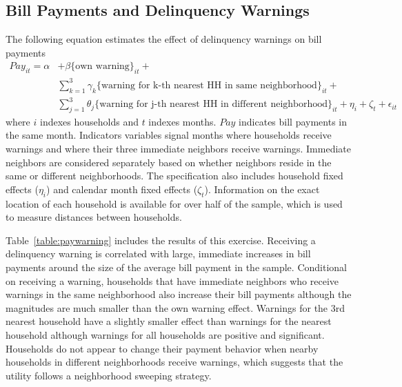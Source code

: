 \documentclass[12pt,table]{article}
\begin{document}
\subsection{Bill Payments and Delinquency Warnings}\label{appendix:paywarning}

The following equation estimates the effect of delinquency warnings on bill payments
\begin{align*}
Pay_{it} = \alpha &+ \beta  \{ \text{own warning} \}_{it} + \\
 &\sum_{k=1}^{3} \gamma_k \{ \text{warning for k-th nearest HH in same neighborhood} \}_{it} +  \\
 &\sum_{j=1}^{3} \theta_j \{ \text{warning for j-th nearest HH in different neighborhood} \}_{it} + \eta_i + \zeta_t + \epsilon_{it}
\end{align*}
where $i$ indexes households and $t$ indexes months.  $Pay$ indicates bill payments in the same month.  Indicators variables signal months where households receive warnings and where their three immediate neighbors receive warnings.  Immediate neighbors are considered separately based on whether neighbors reside in the same or different neighborhoods.  The specification also includes household fixed effects ($\eta_i$) and calendar month fixed effects ($\zeta_t$).  Information on the exact location of each household is available for over half of the sample, which is used to measure distances between households.

Table~\ref{table:paywarning} includes the results of this exercise.  Receiving a delinquency warning is correlated with large, immediate increases in bill payments around the size of the average bill payment in the sample.  Conditional on receiving a warning, households that have immediate neighbors who receive warnings in the same neighborhood also increase their bill payments although the magnitudes are much smaller than the own warning effect.  Warnings for the 3rd nearest household have a slightly smaller effect than warnings for the nearest household although warnings for all households are positive and significant.  Households do not appear to change their payment behavior when nearby households in different neighborhoods receive warnings, which suggests that the utility follows a neighborhood sweeping strategy.
\end{document}
